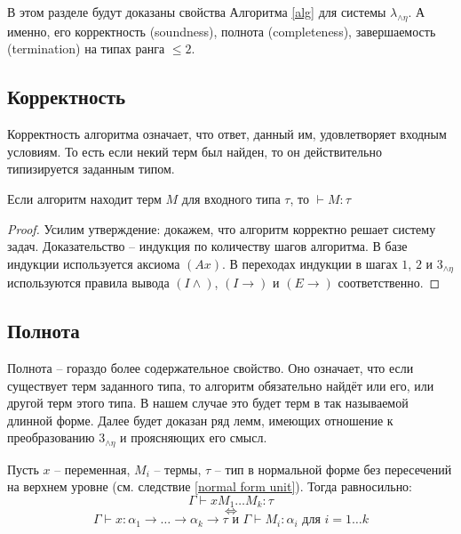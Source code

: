 \documentclass[../main.tex]{subfiles}
\begin{document}
В этом разделе будут доказаны свойства Алгоритма \ref{alg} для системы $\lambda_{\wedge \eta}$. А именно, его корректность (soundness), полнота (completeness), завершаемость (termination) на типах ранга $\leqslant 2$.


\subsection{Корректность}

Корректность алгоритма означает, что ответ, данный им, удовлетворяет входным условиям. То есть если некий терм был найден, то он действительно типизируется заданным типом.

\begin{theorem}[Soundness] \label{soundness}
Если алгоритм находит терм $M$ для входного типа $\tau$, то $\vdash M \colon \tau$
\end{theorem}
\begin{proof}
Усилим утверждение: докажем, что алгоритм корректно решает систему задач. Доказательство -- индукция по количеству шагов алгоритма. В базе индукции используется аксиома $(Ax)$. В переходах индукции в шагах $1$, $2$ и $3_{\wedge \eta}$ используются правила вывода $(I \wedge)$, $(I \to)$ и $(E \to)$ соответственно.
\end{proof}

\subsection{Полнота}

Полнота -- гораздо более содержательное свойство. Оно означает, что если существует терм заданного типа, то алгоритм обязательно найдёт или его, или другой терм этого типа. В нашем случае это будет терм в так называемой длинной форме.
Далее будет доказан ряд лемм, имеющих отношение к преобразованию $3_{\wedge \eta}$ и проясняющих его смысл. 

\begin{lemma} \label{необходимая типизация}

Пусть $x$ -- переменная, $M_i$ -- термы, $\tau$ -- тип в нормальной форме без пересечений на верхнем уровне (см. следствие \ref{normal form unit}). Тогда равносильно: 
    $$\Gamma \vdash x M_1 \dots M_k \colon \tau$$ 
    $$\iff$$
    $$\Gamma \vdash x \colon \alpha_1 \to \dots \to \alpha_k \to \tau \text{ и } \Gamma \vdash M_i \colon \alpha_i \text{ для } i = 1 \dots k$$
\end{lemma}
\end{document}

